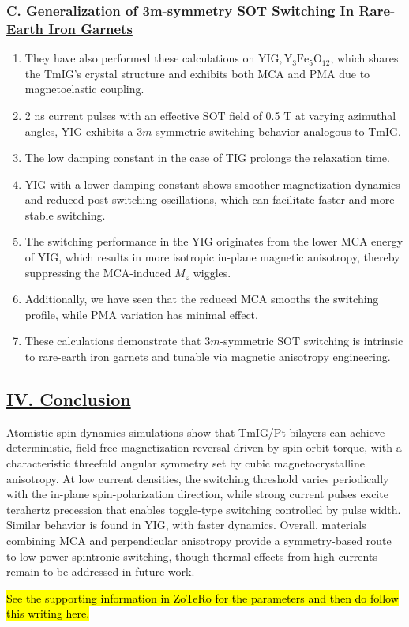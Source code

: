 \subsubsection*{\underline{C. Generalization of 3m-symmetry SOT Switching In Rare-Earth Iron Garnets}}
\begin{enumerate}
    \item They have also performed these calculations on $\mathrm{YIG, Y_3Fe_5O_{12}}$, which shares the TmIG's crystal structure and exhibits both MCA and PMA due to magnetoelastic coupling.
    \item  2 ns current pulses with an effective SOT field of 0.5 T at varying azimuthal angles, YIG exhibits a $3m$-symmetric switching behavior analogous to TmIG.
    \item The low damping constant in the case of TIG prolongs the relaxation time.
    \item YIG with a lower damping constant shows smoother magnetization dynamics and reduced post switching oscillations, which can facilitate faster and more stable switching.
    \item The switching performance in the YIG originates from the lower MCA energy of YIG, which results in more isotropic in-plane magnetic anisotropy, thereby suppressing the MCA-induced $M_z$ wiggles.
    \item Additionally, we have seen that the reduced MCA smooths the switching profile, while PMA variation has minimal effect.
    \item These calculations demonstrate that $3m$-symmetric SOT switching is intrinsic to rare-earth iron garnets and tunable via magnetic anisotropy engineering.
\end{enumerate}
\subsection*{\centering\underline{IV. Conclusion}}
Atomistic spin-dynamics simulations show that TmIG/Pt bilayers can achieve deterministic, field-free magnetization reversal driven by spin-orbit torque, with a characteristic threefold angular symmetry set by cubic magnetocrystalline anisotropy. At low current densities, the switching threshold varies periodically with the in-plane spin-polarization direction, while strong current pulses excite terahertz precession that enables toggle-type switching controlled by pulse width. Similar behavior is found in YIG, with faster dynamics. Overall, materials combining MCA and perpendicular anisotropy provide a symmetry-based route to low-power spintronic switching, though thermal effects from high currents remain to be addressed in future work.

\hl{See the supporting information in ZoTeRo for the parameters and then do follow this writing here.}